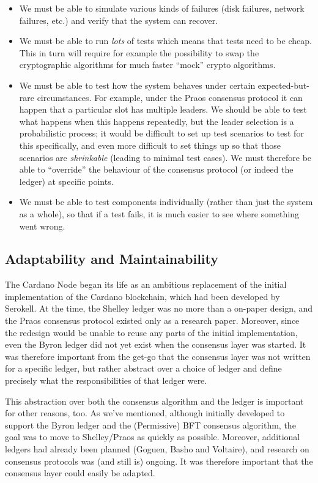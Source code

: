 \begin{itemize}
\item We must be able to simulate various kinds of failures (disk
failures, network failures, etc.) and verify that the system can recover.
\item We must be able to run \emph{lots} of tests which means that tests need to
be cheap. This in turn will require for example the possibility to swap the
cryptographic algorithms for much faster ``mock'' crypto algorithms.
\item We must be able to test how the system behaves under certain
expected-but-rare circumstances. For example, under the Praos consensus
protocol it can happen that a particular slot has multiple leaders. We should be
able to test what happens when this happens repeatedly, but the leader selection
is a probabilistic process; it would be difficult to set up test scenarios to
test for this specifically, and even more difficult to set things up so that
those scenarios are \emph{shrinkable} (leading to minimal test cases). We must
therefore be able to ``override'' the behaviour of the consensus protocol (or
indeed the ledger) at specific points.
\item We must be able to test components individually (rather than just the
system as a whole), so that if a test fails, it is much easier to see where
something went wrong.
\end{itemize}

\subsection{Adaptability and Maintainability}
\label{adaptability}

The Cardano Node began its life as an ambitious replacement of the initial
implementation of the Cardano blockchain, which had been developed by Serokell.
At the time, the Shelley ledger was no more than a on-paper design, and
the Praos consensus protocol existed only as a research paper. Moreover, since
the redesign would be unable to reuse any parts of the initial implementation,
even the Byron ledger did not yet exist when the consensus layer was started.
It was therefore important from the get-go that the consensus layer was not
written for a specific ledger, but rather abstract over a choice of ledger
and define precisely what the responsibilities of that ledger were.

This abstraction over both the consensus algorithm and the ledger is important
for other reasons, too. As we've mentioned, although initially developed to
support the Byron ledger and the (Permissive) BFT consensus algorithm, the goal
was to move to Shelley/Praos as quickly as possible. Moreover, additional
ledgers had already been planned (Goguen, Basho and Voltaire), and research on
consensus protocols was (and still is) ongoing. It was therefore important that
the consensus layer could easily be adapted.

